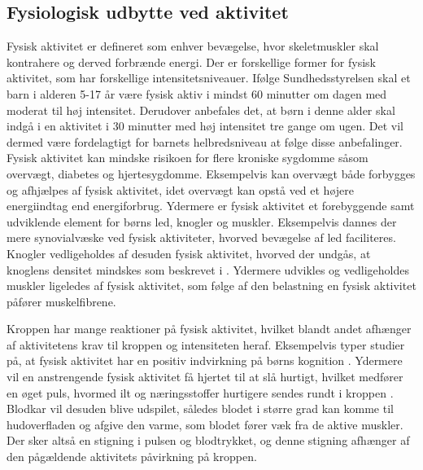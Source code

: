 \subsection{Fysiologisk udbytte ved aktivitet}\label{subsec:fysio_aktivitet}
Fysisk aktivitet er defineret som enhver bevægelse, hvor skeletmuskler skal kontrahere og derved forbrænde energi. Der er forskellige former for fysisk aktivitet, som har forskellige intensitetsniveauer. \citep{Academic2016a} Ifølge Sundhedsstyrelsen skal et barn i alderen 5-17 år være fysisk aktiv i mindst 60 minutter om dagen med moderat til høj intensitet. Derudover anbefales det, at børn i denne alder skal indgå i en aktivitet i 30 minutter med høj intensitet tre gange om ugen. Det vil dermed være fordelagtigt for barnets helbredsniveau at følge disse anbefalinger. \citep{Sundhedsstyrelsen2016}\newline
Fysisk aktivitet kan mindske risikoen for flere kroniske sygdomme såsom overvægt, diabetes og hjertesygdomme. Eksempelvis kan overvægt både forbygges og afhjælpes af fysisk aktivitet, idet overvægt kan opstå ved et højere energiindtag end energiforbrug. Ydermere er fysisk aktivitet et forebyggende samt udviklende element for børns led, knogler og muskler. Eksempelvis dannes der mere synovialvæske ved fysisk aktiviteter, hvorved bevægelse af led faciliteres. Knogler vedligeholdes af desuden fysisk aktivitet, hvorved der undgås, at knoglens densitet mindskes som beskrevet i . Ydermere udvikles og vedligeholdes muskler ligeledes af fysisk aktivitet, som følge af den belastning en fysisk aktivitet påfører muskelfibrene.  %
\citep{Academic2016a,Smith1991,Academic2016b,Cotman2007,CenterforDiseaseControlandPrevention2015}

Kroppen har mange reaktioner på fysisk aktivitet, hvilket blandt andet afhænger af aktivitetens krav til kroppen og intensiteten heraf. %
Eksempelvis typer studier på, at fysisk aktivitet har en positiv indvirkning på børns kognition \citep{SibleyEtnier2003}. Ydermere vil en anstrengende fysisk aktivitet få hjertet til at slå hurtigt, hvilket medfører en øget puls, hvormed ilt og næringsstoffer hurtigere sendes rundt i kroppen \citep{Hjerteforeningen}. Blodkar vil desuden blive udspilet, således blodet i større grad kan komme til hudoverfladen og afgive den varme, som blodet fører væk fra de aktive muskler. Der sker altså en stigning i pulsen og blodtrykket, og denne stigning afhænger af den pågældende aktivitets påvirkning på kroppen. \citep{Martini2012,Stanfield2013,Berchtold2010}


